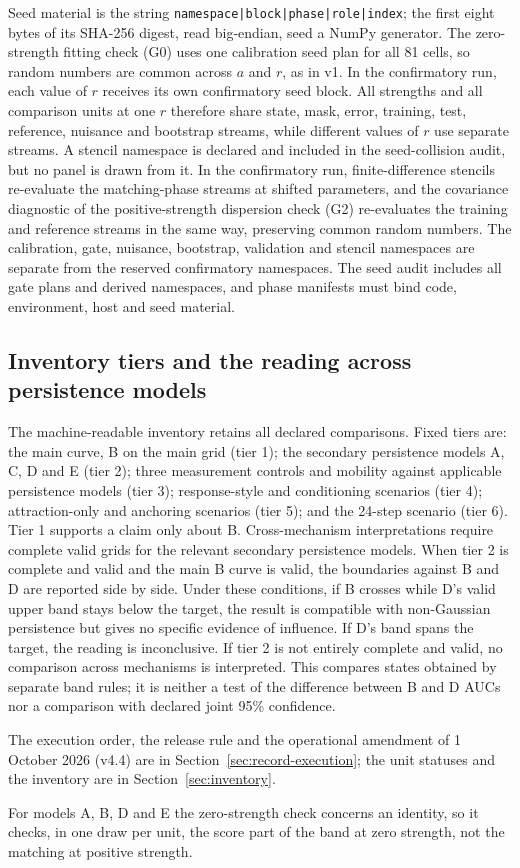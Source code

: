 Seed material is the string \texttt{namespace|block|phase|role|index}; the first eight bytes of its SHA-256 digest, read big-endian, seed a NumPy generator. The zero-strength fitting check (G0) uses one calibration seed plan for all 81 cells, so random numbers are common across $a$ and $r$, as in v1. In the confirmatory run, each value of $r$ receives its own confirmatory seed block. All strengths and all comparison units at one $r$ therefore share state, mask, error, training, test, reference, nuisance and bootstrap streams, while different values of $r$ use separate streams. A stencil namespace is declared and included in the seed-collision audit, but no panel is drawn from it. In the confirmatory run, finite-difference stencils re-evaluate the matching-phase streams at shifted parameters, and the covariance diagnostic of the positive-strength dispersion check (G2) re-evaluates the training and reference streams in the same way, preserving common random numbers. The calibration, gate, nuisance, bootstrap, validation and stencil namespaces are separate from the reserved confirmatory namespaces. The seed audit includes all gate plans and derived namespaces, and phase manifests must bind code, environment, host and seed material. %

\subsection{Inventory tiers and the reading across persistence models}\label{sec:dd-inventory}

The machine-readable inventory retains all declared comparisons. Fixed tiers are: the main curve, B on the main grid (tier 1); the secondary persistence models A, C, D and E (tier 2); three measurement controls and mobility against applicable persistence models (tier 3); response-style and conditioning scenarios (tier 4); attraction-only and anchoring scenarios (tier 5); and the 24-step scenario (tier 6). Tier 1 supports a claim only about B. Cross-mechanism interpretations require complete valid grids for the relevant secondary persistence models. When tier 2 is complete and valid and the main B curve is valid, the boundaries against B and D are reported side by side. Under these conditions, if B crosses while D's valid upper band stays below the target, the result is compatible with non-Gaussian persistence but gives no specific evidence of influence. If D's band spans the target, the reading is inconclusive. If tier 2 is not entirely complete and valid, no comparison across mechanisms is interpreted. This compares states obtained by separate band rules; it is neither a test of the difference between B and D AUCs nor a comparison with declared joint 95\% confidence.

The execution order, the release rule and the operational amendment of 1 October 2026 (v4.4) are in Section~\ref{sec:record-execution}; the unit statuses and the inventory are in Section~\ref{sec:inventory}.

For models A, B, D and E the zero-strength check concerns an identity, so it checks, in one draw per unit, the score part of the band at zero strength, not the matching at positive strength.
